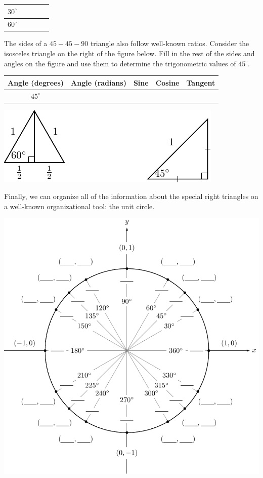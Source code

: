\begin{activity}
\begin{center}
\begin{tabular}{|c|c||c|c|c|}
                    \hline
                    $30^\circ$ & & & & \\ \hline
                    $60^\circ$ & & & & \\ \hline
                \end{tabular}
            \end{center}
        \item The sides of a $45-45-90$ triangle also follow well-known ratios.  Consider
            the isosceles triangle on the right of the figure below.  Fill in the rest of
            the sides and angles on the figure and use them to determine the trigonometric
            values of $45^\circ$.
            \begin{center}
                \begin{tabular}{|c|c||c|c|c|}
                    \hline
                    Angle (degrees) & Angle (radians) & Sine & Cosine & Tangent \\ \hline
                    \hline
                    $45^\circ$ & & & & \\ \hline
                \end{tabular}
            \end{center}
    \begin{center}
        \includegraphics[width=0.5\columnwidth]{figures/0-5-fig_specialright.pdf}
    \end{center}
        \item Finally, we can organize all of the information about the special right
            triangles on a well-known organizational tool: the unit circle.  
    \begin{center}
        \includegraphics[width=0.7\columnwidth]{figures/0-5-UnitCircle.pdf}
    \end{center}
    \ea

\end{activity}
